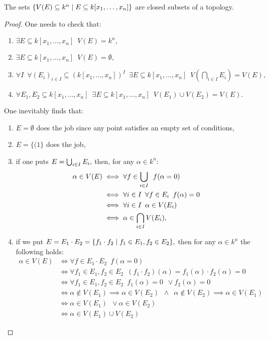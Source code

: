 \begin{lemma}
  \label{zariski algebraic sets}
  The sets
  \(\{V(E) \subseteq k^n \mathrel{|} E \subseteq k[x_1, \dotsc, x_n]\}\)
  are closed subsets of a topology.
\end{lemma}
\begin{proof}
  One needs to check that:
  \begin{enumerate}
  \item \(\exists E \subseteq k[x_1, \dotsc, x_n] \enspace V(E) = k^n,\)
  \item \(\exists E \subseteq k[x_1, \dotsc, x_n] \enspace V(E) = \emptyset,\)
  \item \(\forall I \enspace \forall (E_i)_{i \in I} \subseteq (k[x_1, \dotsc, x_n])^I \enspace \exists E \subseteq k[x_1, \dotsc, x_n] \enspace V(\bigcap_{i \in I} E_i) = V(E),\)
  \item \(\forall E_1, E_2 \subseteq k[x_1, \dotsc, x_n] \enspace \exists E \subseteq k[x_1, \dotsc, x_n] \enspace V(E_1) \cup V(E_2) = V(E).\)
    \end{enumerate}
  One inevitably finds that:
  \begin{enumerate}
  \item \(E = \emptyset\) does the job since any point satisfies an empty set of conditions,
  \item \(E = \{(1\}\) does the job,
  \item if one puts \(E = \operatorname*{\bigcup}_{i \in I} E_i,\)
    then, for any \(\alpha \in k^n:\)
    \begin{align*}
      \alpha \in V(E) & \iff \forall f \in \operatorname*{\bigcup}_{i \in I} \enspace f(\alpha = 0) \\
                      & \iff \forall i \in I \enspace \forall f \in E_i \enspace f(\alpha) = 0 \\
                      & \iff \forall i \in I \enspace \alpha \in V(E_i) \\
                      & \iff \alpha \in \operatorname*{\bigcap}_{i \in I} V(E_i),
    \end{align*}
  \item if we put \(E = E_1 \cdot E_2 = \{f_1 \cdot f_2 \mathrel{|} f_1 \in E_1, f_2 \in E_2\},\) then for any \(\alpha \in k^n\) the following holds:
    \begin{align*}
      \alpha \in V(E) & \iff \forall f \in E_1 \cdot E_2 \enspace f(\alpha = 0) \\
                      & \iff \forall f_1 \in E_1, f_2 \in E_2 \enspace (f_1 \cdot f_2)(\alpha) = f_1(\alpha) \cdot f_2(\alpha) = 0 \\
                      & \iff \forall f_1 \in E_1, f_2 \in E_2 \enspace f_1(\alpha) = 0 \enspace \lor f_2(\alpha) = 0 \\
                      & \iff \alpha \notin V(E_1) \implies \alpha \in V(E_2) \enspace \land \enspace \alpha \notin V(E_2) \implies \alpha \in V(E_1) \\
                      & \iff \alpha \in V(E_1) \enspace \lor \alpha \in V(E_2) \\
                      & \iff \alpha \in V(E_1) \cup V(E_2)
    \end{align*}
  \end{enumerate}
\end{proof}


